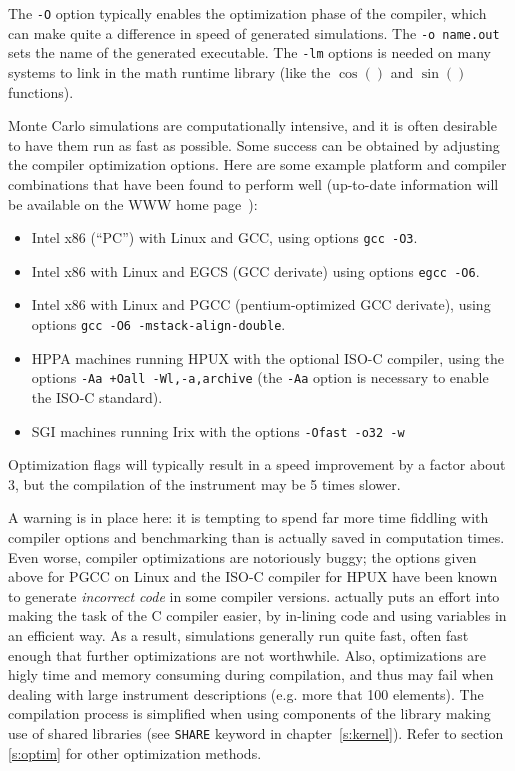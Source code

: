 The \verb+-O+ option typically enables the optimization phase of the compiler,
which can make quite a difference in speed of \MCX generated simulations. The
\verb+-o name.out+ sets the name of the generated executable. The \verb+-lm+
options is needed on many systems to link in the math runtime library (like the
$\cos()$ and $\sin()$ functions). 

Monte Carlo simulations are computationally intensive, and it is
often desirable to have them run as fast as possible. Some success can
be obtained by adjusting the compiler optimization
options. Here are some example platform and compiler combinations that
have been found to perform well (up-to-date information will be
available on the \MCX WWW home page~\cite{mcxtrace_webpage}):
\begin{itemize}
\item Intel x86 (``PC'') with Linux and GCC, using options \verb+gcc -O3+.
\item Intel x86 with Linux and EGCS (GCC derivate) using
  options \verb+egcc -O6+.
\item Intel x86 with Linux and PGCC (pentium-optimized GCC derivate), using
  options \verb+gcc -O6 -mstack-align-double+.
\item HPPA machines running HPUX with the optional ISO-C compiler,
  using the options
  \verb|-Aa +Oall -Wl,-a,archive| (the \verb+-Aa+ option is necessary to
  enable the ISO-C standard).
\item SGI machines running Irix with the options
  \verb|-Ofast -o32 -w|
\end{itemize}
Optimization flags will typically result in a speed improvement by a factor
about 3, but the compilation of the instrument may be 5 times slower.

A warning is in place here: it is tempting to spend far more time
fiddling with compiler options and benchmarking than is actually saved
in computation times. Even worse, compiler optimizations are notoriously
buggy; the options given above for PGCC on Linux and the ISO-C compiler
for HPUX have been known to generate \emph{incorrect code} in some
compiler versions. \MCX actually puts an effort into making the task of the C compiler
easier, by in-lining code and using variables in an efficient way. As a
result, \MCX simulations generally run quite fast, often fast enough
that further optimizations are not worthwhile. Also, optimizations are higly
time and memory consuming during compilation, and thus may fail when dealing
with large instrument descriptions (e.g. more that 100 elements). The compilation process is simplified when using components of the library making use of shared libraries (see \verb+SHARE+ keyword in chapter~\ref{s:kernel}). Refer to section \ref{s:optim} for other optimization methods.

